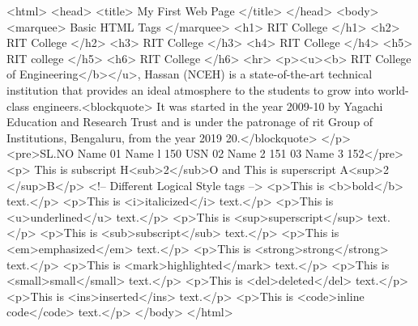 <html> 
<head> 
<title> My First Web Page </title> 
</head> 
<body> 
<marquee> Basic HTML Tags </marquee> 
<h1> RIT College </h1> 
<h2> RIT College </h2> 
<h3> RIT College </h3> 
<h4> RIT College </h4> 
<h5> RIT college </h5> 
<h6> RIT College </h6> 
<hr> 
<p><u><b> RIT College of Engineering</b></u>, Hassan (NCEH) is a state-of-the-art technical 
institution that provides an ideal atmosphere to the students to grow into world-class 
engineers.<blockquote> It was started in the year 2009-10 by Yagachi Education and  Research Trust 
and is under the patronage of rit Group of Institutions, Bengaluru, from the year 2019
20.</blockquote> </p> 
<pre>SL.NO    Name     
01    
  Name l    150 
 USN 
 02      Name 2    151 
 03      Name 3    152</pre> 
<p> This is subscript H<sub>2</sub>O and This is superscript A<sup>2 </sup>B</p> 
<!-- Different Logical Style tags -->
    <p>This is <b>bold</b> text.</p>
    <p>This is <i>italicized</i> text.</p>
    <p>This is <u>underlined</u> text.</p>
    <p>This is <sup>superscript</sup> text.</p>
    <p>This is <sub>subscript</sub> text.</p>
    <p>This is <em>emphasized</em> text.</p>
    <p>This is <strong>strong</strong> text.</p>
    <p>This is <mark>highlighted</mark> text.</p>
    <p>This is <small>small</small> text.</p>
    <p>This is <del>deleted</del> text.</p>
    <p>This is <ins>inserted</ins> text.</p>
    <p>This is <code>inline code</code> text.</p>
</body> 
</html> 

